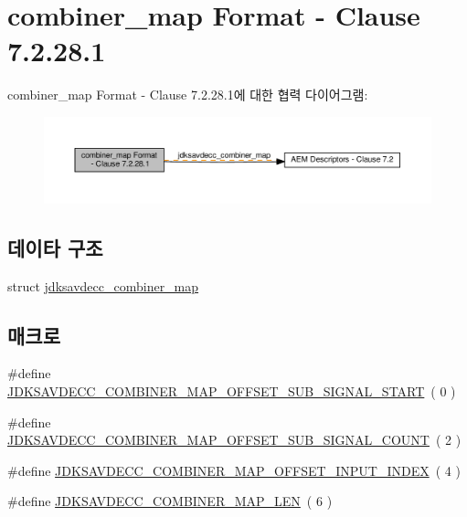 \hypertarget{group__combiner__map}{}\section{combiner\+\_\+map Format -\/ Clause 7.2.28.1}
\label{group__combiner__map}
combiner\+\_\+map Format -\/ Clause 7.2.28.1에 대한 협력 다이어그램\+:
\nopagebreak
\begin{figure}[H]
\begin{center}
\leavevmode
\includegraphics[width=350pt]{group__combiner__map}
\end{center}
\end{figure}
\subsection*{데이타 구조}
\begin{DoxyCompactItemize}
\item 
struct \hyperlink{structjdksavdecc__combiner__map}{jdksavdecc\+\_\+combiner\+\_\+map}
\end{DoxyCompactItemize}
\subsection*{매크로}
\begin{DoxyCompactItemize}
\item 
\#define \hyperlink{group__combiner__map_ga4dc9cc328f02af91e34cbf22835ed95a}{J\+D\+K\+S\+A\+V\+D\+E\+C\+C\+\_\+\+C\+O\+M\+B\+I\+N\+E\+R\+\_\+\+M\+A\+P\+\_\+\+O\+F\+F\+S\+E\+T\+\_\+\+S\+U\+B\+\_\+\+S\+I\+G\+N\+A\+L\+\_\+\+S\+T\+A\+RT}~( 0 )
\item 
\#define \hyperlink{group__combiner__map_ga6bc6dd1abb54d12c9af0adf3dea38c91}{J\+D\+K\+S\+A\+V\+D\+E\+C\+C\+\_\+\+C\+O\+M\+B\+I\+N\+E\+R\+\_\+\+M\+A\+P\+\_\+\+O\+F\+F\+S\+E\+T\+\_\+\+S\+U\+B\+\_\+\+S\+I\+G\+N\+A\+L\+\_\+\+C\+O\+U\+NT}~( 2 )
\item 
\#define \hyperlink{group__combiner__map_gad2a9b9293252a0872808741240a44542}{J\+D\+K\+S\+A\+V\+D\+E\+C\+C\+\_\+\+C\+O\+M\+B\+I\+N\+E\+R\+\_\+\+M\+A\+P\+\_\+\+O\+F\+F\+S\+E\+T\+\_\+\+I\+N\+P\+U\+T\+\_\+\+I\+N\+D\+EX}~( 4 )
\item 
\#define \hyperlink{group__combiner__map_ga5cc4ad441b9a0e54a9d5e57c9ec88834}{J\+D\+K\+S\+A\+V\+D\+E\+C\+C\+\_\+\+C\+O\+M\+B\+I\+N\+E\+R\+\_\+\+M\+A\+P\+\_\+\+L\+EN}~( 6 )
\end{DoxyCompactItemize}
